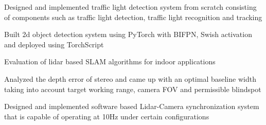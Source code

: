 \documentclass[]{deedy-resume-openfont}
\begin{document}
\begin{minipage}[t]{0.69\textwidth}
\vspace{\topsep} %
\begin{tightemize}
\item Designed and implemented traffic light detection system from scratch consisting of components such as traffic light detection, traffic light recognition and tracking
\item Built 2d object detection system using PyTorch with BIFPN, Swish activation and deployed using TorchScript
\item Evaluation of lidar based SLAM algorithms for indoor applications
\item Analyzed the depth error of stereo and came up with an optimal baseline width taking into account target working range, camera FOV and permissible blindspot
\item Designed and implemented software based Lidar-Camera synchronization system that is capable of operating at 10Hz under certain configurations
\end{tightemize}
\sectionsep



\end{minipage}
\end{document}
